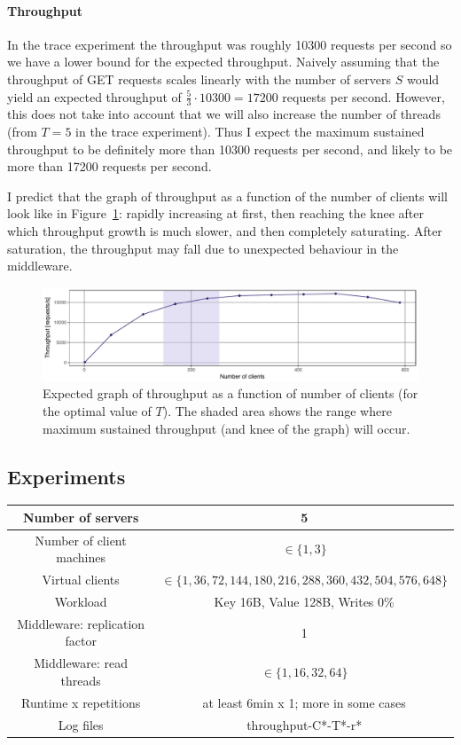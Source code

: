 \documentclass[11pt]{article}
\begin{document}
\paragraph{Throughput}
In the trace experiment the throughput was roughly 10300 requests per second so we have a lower bound for the expected throughput. Naively assuming that the throughput of GET requests scales linearly with the number of servers $S$ would yield an expected throughput of $\frac{5}{3} \cdot 10300 = 17200$ requests per second. However, this does not take into account that we will also increase the number of threads (from $T=5$ in the trace experiment). Thus I expect the maximum sustained throughput to be definitely more than 10300 requests per second, and likely to be more than 17200 requests per second.

I predict that the graph of throughput as a function of the number of clients will look like in Figure~\ref{fig:exp1:hyp:throughput}: rapidly increasing at first, then reaching the knee after which throughput growth is much slower, and then completely saturating. After saturation, the throughput may fall due to unexpected behaviour in the middleware.

\begin{figure}[h]
\centering
\includegraphics[width=\textwidth]{figures/hypothesis_throughput.pdf}
\caption{Expected graph of throughput as a function of number of clients (for the optimal value of $T$). The shaded area shows the range where maximum sustained throughput (and knee of the graph) will occur.}
\label{fig:exp1:hyp:throughput}
\end{figure}

\subsection{Experiments}
\begin{center}
\small{
\smallskip
\begin{tabular}{|c|c|}
\hline Number of servers & 5 \\ 
\hline Number of client machines & $\in \{1, 3\}$ \\ 
\hline Virtual clients & $\in \{1, 36, 72, 144, 180, 216, 288, 360, 432, 504, 576, 648\}$ \\ 
\hline Workload & Key 16B, Value 128B, Writes 0\% \\
\hline Middleware: replication factor & 1 \\ 
\hline Middleware: read threads & $\in\{1, 16, 32, 64\}$ \\ 
\hline Runtime x repetitions & at least 6min x 1; more in some cases \\ 
\hline Log files & throughput-C*-T*-r* \\
\hline 
\end{tabular} }
\end{center}
\end{document}
